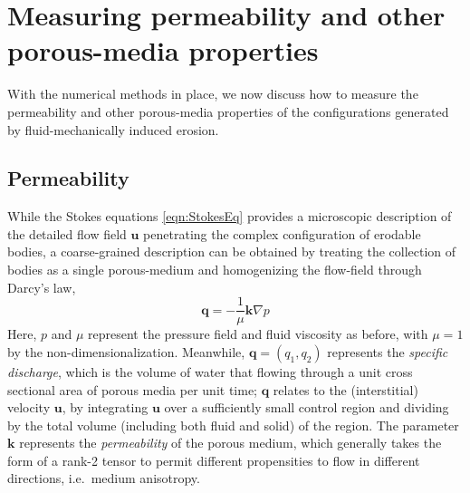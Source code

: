 \documentclass[3p]{elsarticle}
\newcommand{\grad}{{\nabla}}
\newcommand{\uu}{{\mathbf{u}}}
\newcommand{\bvec}[1]{\mathbf{#1}}
\newcommand {\bq} {\bvec{q}}
\begin{document}
\section{Measuring permeability and other porous-media properties}
\label{sec:}

With the numerical methods in place, we now discuss how to measure the permeability and other porous-media properties of the configurations generated by fluid-mechanically induced erosion.

\subsection{Permeability}

While the Stokes equations \eqref{eqn:StokesEq} provides a microscopic description of the detailed flow field $\uu$ penetrating the complex configuration of erodable bodies, a coarse-grained description can be obtained by treating the collection of bodies as a single porous-medium and homogenizing the flow-field through Darcy's law,
\begin{equation}
\label{eqn:Darcy}
\bq = - \frac{1}{\mu} \bvec{k} \grad p
\end{equation}
Here, $p$ and $\mu$ represent the pressure field and fluid viscosity as before, with $\mu = 1$ by the non-dimensionalization. Meanwhile, $\bq = (q_1, q_2)$ represents the {\em specific discharge}, which is the volume of water that flowing through a unit cross sectional area of porous media per unit time; $\bq$ relates to the (interstitial) velocity $\uu$, by integrating $\uu$ over a sufficiently small control region and dividing by the total volume (including both fluid and solid) of the region. The parameter $\bvec{k}$ represents the {\em permeability} of the porous medium, which generally takes the form of a rank-2 tensor to permit different propensities to flow in different directions, i.e.~medium anisotropy. 


\end{document}
